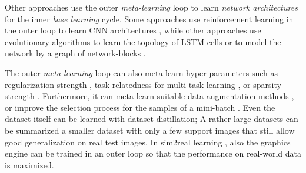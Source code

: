 Other approaches use the outer \emph{meta-learning} loop to learn \emph{network architectures} for the inner \emph{base learning} cycle.
Some approaches use reinforcement learning in the outer loop to learn CNN architectures \cite{zoph2017neural}, while other approaches use evolutionary algorithms to learn the topology of LSTM cells \cite{Bayer_Wierstra_Togelius_Schmidhuber_2009} or to model the network by a graph of network-blocks \cite{10-1609-aaai-v33i01-33014780}.

The outer \emph{meta-learning} loop can also meta-learn hyper-parameters such as regularization-strength \cite{pmlr-v80-franceschi18a, Micaelli_Storkey_2021}, task-relatedness for multi-task learning \cite{10-5555-3305381-3305502}, or sparsity-strength \cite{10-5555-3305381-3305502}. Furthermore, it can meta learn suitable data augmentation methods \cite{Cubuk_2019_CVPR, Li_Hu_Wang_Hospedales_Robertson_Yang_2020}, or improve the selection process for the samples of a mini-batch \cite{10-1609-aaai-v33i01-33015741, fan2018learning}.
Even the dataset itself can be learned with dataset distillation; A rather large datasets can be summarized a smaller dataset with only a few support images \cite{Wang_Zhu_Torralba_Efros_2020, pmlr-v108-lorraine20a} that still allow good generalization on real test images. In sim2real learning \cite{Andrychowicz_Baker_Chociej_Józefowicz_McGrew_Pachocki_Petron_Plappert_Powell_Ray_2020}, also the graphics engine \cite{ruiz2018learning, Vuong_Vikram_Su_Gao_Christensen_2019} can be trained in an outer loop so that the performance on real-world data is maximized.

